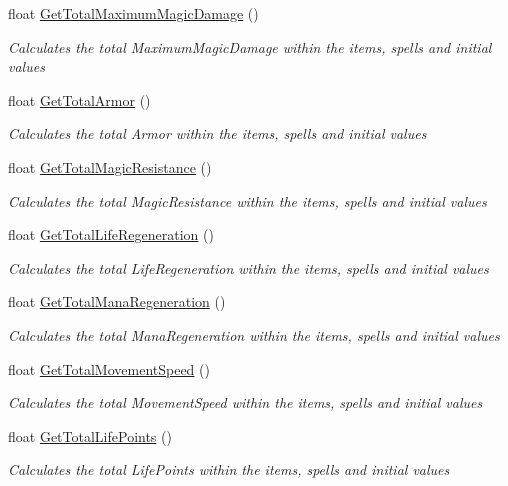 \begin{DoxyCompactItemize}
float \hyperlink{class_hel_project_1_1_features_1_1_feature_manager_a53a153e4dae0b823c34e4546968d927e}{Get\+Total\+Maximum\+Magic\+Damage} ()
\begin{DoxyCompactList}\small\item\em Calculates the total Maximum\+Magic\+Damage within the items, spells and initial values \end{DoxyCompactList}\item 
float \hyperlink{class_hel_project_1_1_features_1_1_feature_manager_aeae79cbc3c27d4fd9796269a26e3d349}{Get\+Total\+Armor} ()
\begin{DoxyCompactList}\small\item\em Calculates the total Armor within the items, spells and initial values \end{DoxyCompactList}\item 
float \hyperlink{class_hel_project_1_1_features_1_1_feature_manager_aa00b054d0ce926e2a1c0839364a55a81}{Get\+Total\+Magic\+Resistance} ()
\begin{DoxyCompactList}\small\item\em Calculates the total Magic\+Resistance within the items, spells and initial values \end{DoxyCompactList}\item 
float \hyperlink{class_hel_project_1_1_features_1_1_feature_manager_ae58d9838038b0589739863d3aefc5e9a}{Get\+Total\+Life\+Regeneration} ()
\begin{DoxyCompactList}\small\item\em Calculates the total Life\+Regeneration within the items, spells and initial values \end{DoxyCompactList}\item 
float \hyperlink{class_hel_project_1_1_features_1_1_feature_manager_a63c2d856a598a7d37c2f305e066db1d5}{Get\+Total\+Mana\+Regeneration} ()
\begin{DoxyCompactList}\small\item\em Calculates the total Mana\+Regeneration within the items, spells and initial values \end{DoxyCompactList}\item 
float \hyperlink{class_hel_project_1_1_features_1_1_feature_manager_a41763411f2016d354b8f281ea26ea79f}{Get\+Total\+Movement\+Speed} ()
\begin{DoxyCompactList}\small\item\em Calculates the total Movement\+Speed within the items, spells and initial values \end{DoxyCompactList}\item 
float \hyperlink{class_hel_project_1_1_features_1_1_feature_manager_a226f7b884b8de2556e8b12fec879d927}{Get\+Total\+Life\+Points} ()
\begin{DoxyCompactList}\small\item\em Calculates the total Life\+Points within the items, spells and initial values \end{DoxyCompactList}\end{DoxyCompactItemize}
